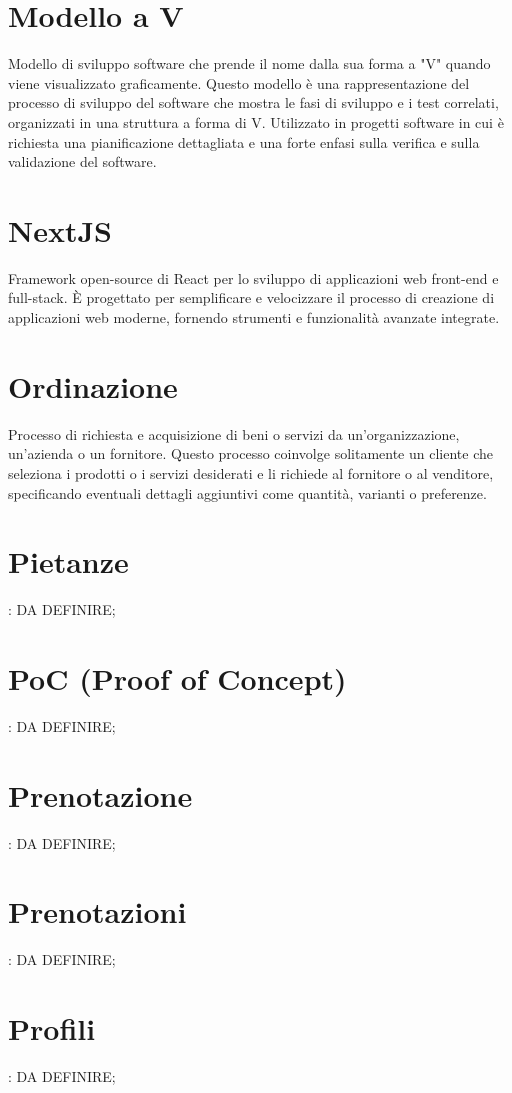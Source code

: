 \section{Modello a V}
Modello di sviluppo software che prende il nome dalla sua forma a "V" quando viene visualizzato graficamente. Questo modello è una rappresentazione del processo di sviluppo del software che mostra le fasi di sviluppo e i test correlati, organizzati in una struttura a forma di V. Utilizzato in progetti software in cui è richiesta una pianificazione dettagliata e una forte enfasi sulla verifica e sulla validazione del software.

\section{NextJS}
Framework open-source di React per lo sviluppo di applicazioni web front-end e full-stack. È progettato per semplificare e velocizzare il processo di creazione di applicazioni web moderne, fornendo strumenti e funzionalità avanzate integrate.

\section{Ordinazione}
Processo di richiesta e acquisizione di beni o servizi da un'organizzazione, un'azienda o un fornitore. Questo processo coinvolge solitamente un cliente che seleziona i prodotti o i servizi desiderati e li richiede al fornitore o al venditore, specificando eventuali dettagli aggiuntivi come quantità, varianti o preferenze.

\section{Pietanze}: DA DEFINIRE;
\section{PoC (Proof of Concept)}: DA DEFINIRE;
\section{Prenotazione}: DA DEFINIRE;
\section{Prenotazioni}: DA DEFINIRE;
\section{Profili}: DA DEFINIRE;
